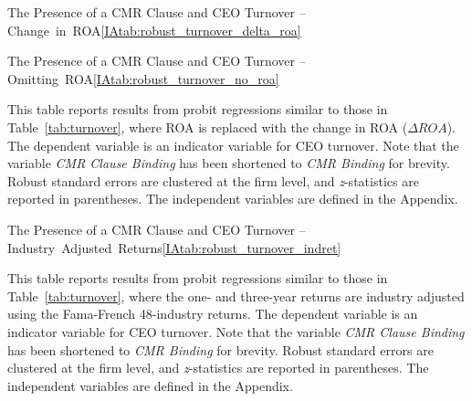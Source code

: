 \documentclass[12pt]{article}
\begin{document}
\begin{appendices}
\begin{singlespace}
\begin{papertable}{The Presence of a CMR Clause and CEO Turnover -- Change~in~ROA}{\ref{IAtab:robust_turnover_delta_roa}}{}
\end{papertable}




\begin{papertable}{The Presence of a CMR Clause and CEO Turnover -- Omitting~ROA}{\ref{IAtab:robust_turnover_no_roa}}{}
  \label{IAtab:robust_turnover_no_roa}

  This table reports results from probit regressions similar to those in Table~\ref{tab:turnover}, where ROA is replaced with the change in ROA ($\Delta ROA$).
  The dependent variable is an indicator variable for CEO turnover.
  Note that the variable \textit{CMR Clause Binding} has been shortened to \textit{CMR Binding} for brevity.
  Robust standard errors are clustered at the firm level, and \textit{z}-statistics are reported in parentheses.
  The independent variables are defined in the Appendix.
  \postamblesig

  \startdata
  

\end{papertable}




\begin{papertable}{The Presence of a CMR Clause and CEO Turnover -- Industry~Adjusted~Returns}{\ref{IAtab:robust_turnover_indret}}{}
  \label{IAtab:robust_turnover_indret}

  This table reports results from probit regressions similar to those in Table~\ref{tab:turnover}, where the one- and three-year returns are industry adjusted using the Fama-French 48-industry returns.
  The dependent variable is an indicator variable for CEO turnover.
  Note that the variable \textit{CMR Clause Binding} has been shortened to \textit{CMR Binding} for brevity.
  Robust standard errors are clustered at the firm level, and \textit{z}-statistics are reported in parentheses.
  The independent variables are defined in the Appendix.
  \postamblesig

  \startdata
  

\end{papertable}





\end{singlespace}
\end{appendices}
\end{document}
